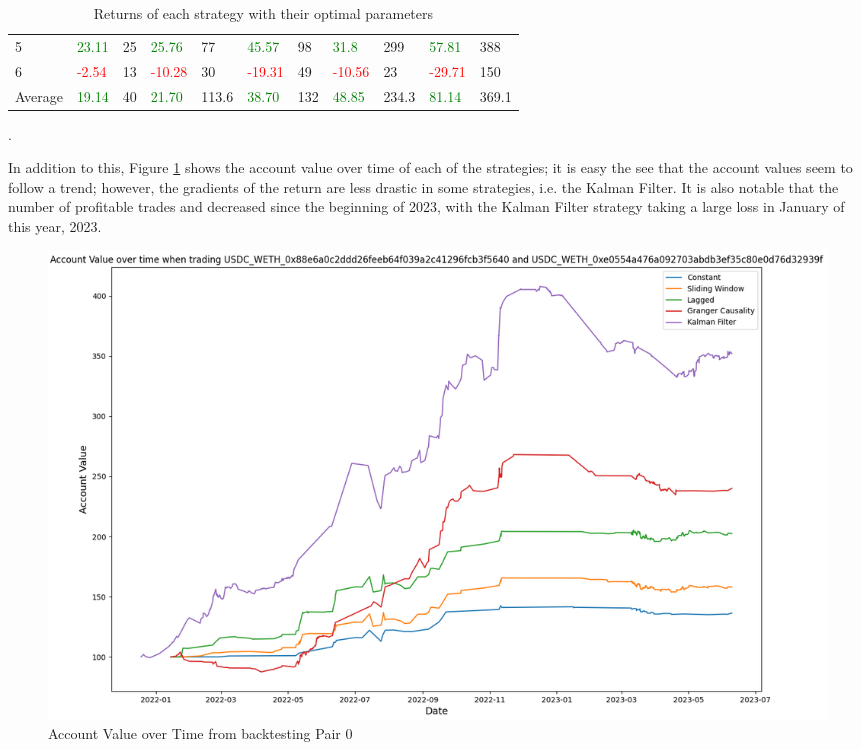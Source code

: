 \begin{table}[H]
\begin{adjustwidth}{-0.8in}{-0.9in}
\begin{tabular}{|p{4em}|p{3em}|p{3em}|p{3em}|p{3em}|p{3em}|p{3em}|p{3em}|p{3em}|p{3em}|p{3em}|}
            5 & \textcolor{green}{23.11} & 25 & \textcolor{green}{25.76} & 77 & \textcolor{green}{45.57} & 98 & \textcolor{green}{31.8} & 299 & \textcolor{green}{57.81} & 388\\\cline{2-11}
            6 & \textcolor{red}{-2.54} & 13 & \textcolor{red}{-10.28} & 30 & \textcolor{red}{-19.31} & 49 & \textcolor{red}{-10.56} & 23 & \textcolor{red}{-29.71} & 150\\\hline\hline           
            Average & \textcolor{green}{19.14} & 40 & \textcolor{green}{21.70} & 113.6 & \textcolor{green}{38.70} & 132 & \textcolor{green}{48.85} & 234.3 & \textcolor{green}{81.14} & 369.1\\\hline                       
        \end{tabular}
    \end{adjustwidth}
    \caption{Returns of each strategy with their optimal parameters \label{tab:FinalResults}}.
\end{table}

\noindent In addition to this, Figure \ref{fig:ValueHistory} shows the account value over time of each of the strategies; it is easy the see that the account values seem to follow a trend; however, the gradients of the return are less drastic in some strategies, i.e. the Kalman Filter. It is also notable that the number of profitable trades and decreased since the beginning of 2023, with the Kalman Filter strategy taking a large loss in January of this year, 2023.

\begin{figure}[H]
    \centering
    \includegraphics[width=\linewidth]{evaluation/Images/ValueHistory.png}
    \caption{Account Value over Time from backtesting Pair 0}
    \label{fig:ValueHistory}
\end{figure}

